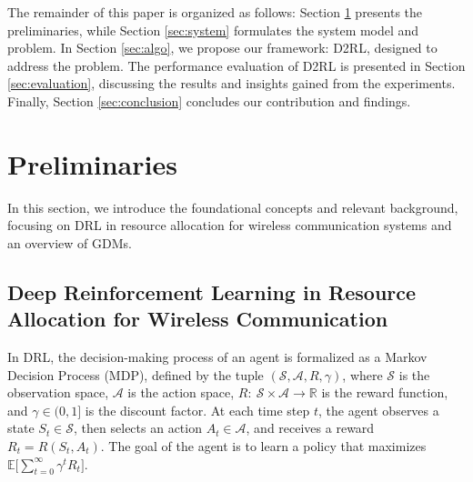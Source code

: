 \documentclass[comsoc,journal]{IEEEtran}
\begin{document}
The remainder of this paper is organized as follows: Section \ref{sec:Preliminaries} presents the preliminaries, while Section \ref{sec:system} formulates the system model and problem. 
In Section \ref{sec:algo}, we propose our framework: D2RL, designed to address the problem.
The performance evaluation of D2RL is presented in Section \ref{sec:evaluation}, discussing the results and insights gained from the experiments. Finally, Section \ref{sec:conclusion} concludes our contribution and findings.

\vspace{-6pt}
\section{Preliminaries}\label{sec:Preliminaries}
In this section, we introduce the foundational concepts and relevant background, focusing on DRL in resource allocation for wireless communication systems and an overview of GDMs.
\vspace{-8pt}
\subsection{Deep Reinforcement Learning in Resource Allocation for Wireless Communication}
In DRL, the decision-making process of an agent is formalized as a Markov Decision Process (MDP), defined by the tuple $(\mathcal{S}, \mathcal{A}, {R}, \gamma)$, where $\mathcal{S}$ is the observation space, $\mathcal{A}$ is the action space, ${R}:\ \mathcal{S} \times \mathcal{A} \rightarrow \mathbb{R}$ is the reward function, and $\gamma \in (0, 1]$ is the discount factor\cite{seid2021multi}. At each time step $t$, the agent observes a state $S_{t}\in \mathcal{S}$, then selects an action $A_{t}\in \mathcal{A}$, and receives a reward $R_{t}=R(S_{t},A_{t})$. The goal of the agent is to learn a policy that maximizes $\mathbb{E}\Big[\sum_{t=0}^{\infty}\gamma^t R_t\Big]$. 
\end{document}
